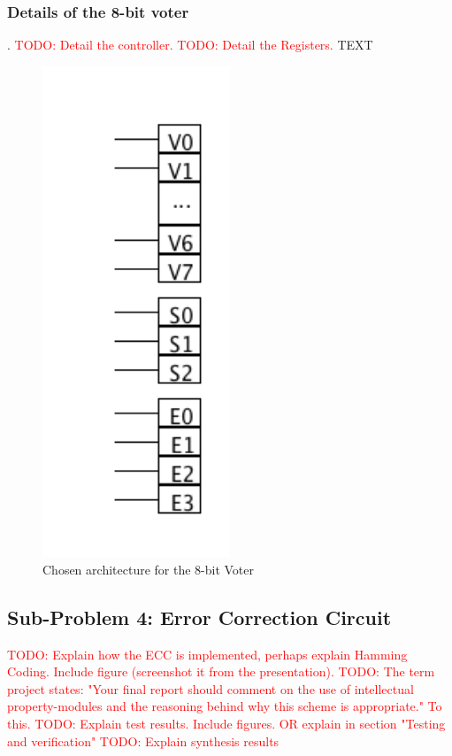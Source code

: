 \documentclass[a4paper]{IEEEtran}
\newcommand\TODO[1]{\textcolor{red}{TODO:#1}}
\newcommand\todo[1]{\TODO{#1}}
\begin{document}
\subsubsection{ Details of the 8-bit voter}.
\todo{ Detail the controller.}
\break
\break
\todo{ Detail the Registers.}
\break
\break
TEXT
\begin{figure}[h!]
  \centering
      \includegraphics[width=0.5\textwidth]{Figures/Registers}
  \caption{Chosen architecture for the 8-bit Voter}
  \label{fig:Registers}
\end{figure}

\subsection{Sub-Problem 4: Error Correction Circuit}
\todo{ Explain how the ECC is implemented, perhaps explain Hamming Coding. Include figure (screenshot it from the presentation). }
\break
\break
\todo{ The term project states: "Your final report should comment on the use of intellectual property-modules and the reasoning behind why this scheme is appropriate." To this.}
\break
\break
\todo{ Explain test results. Include figures. OR explain in section "Testing and verification" }
\break
\break
\todo{ Explain synthesis results}
\end{document}
